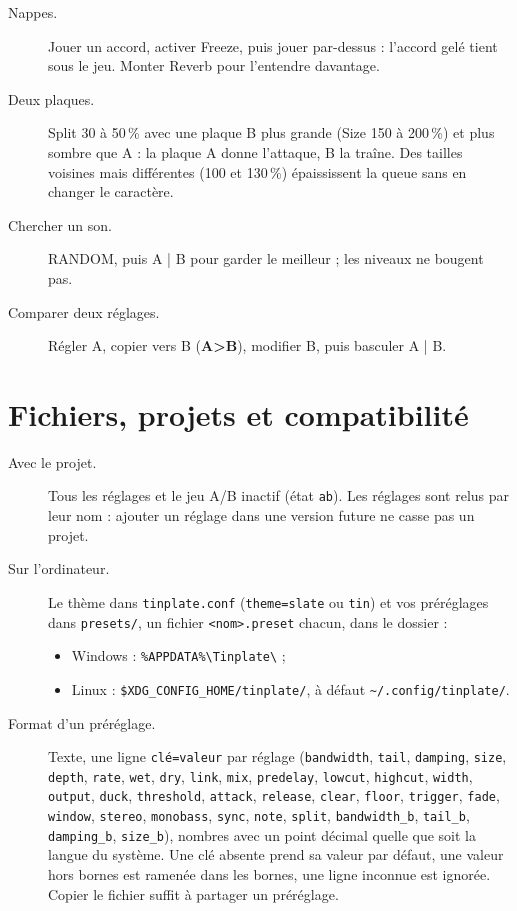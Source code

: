 \documentclass[a4paper,11pt]{article}
\newcommand{\ctl}[1]{\textsf{\textbf{#1}}}   %
\begin{document}
\begin{description}
\item[Nappes.] Jouer un accord, activer Freeze, puis jouer par-dessus : l'accord gelé tient sous
  le jeu. Monter Reverb pour l'entendre davantage.
\item[Deux plaques.] Split 30 à 50\,\% avec une plaque B plus grande (Size 150 à 200\,\%) et
  plus sombre que A : la plaque A donne l'attaque, B la traîne. Des tailles voisines mais
  différentes (100 et 130\,\%) épaississent la queue sans en changer le caractère.
\item[Chercher un son.] RANDOM, puis A | B pour garder le meilleur ; les niveaux ne bougent pas.
\item[Comparer deux réglages.] Régler A, copier vers B (\ctl{A>B}), modifier B, puis basculer A
  | B.
\end{description}

\section{Fichiers, projets et compatibilité}\label{sec:fichiers}

\begin{description}
\item[Avec le projet.] Tous les réglages et le jeu A/B inactif (état \texttt{ab}). Les réglages
  sont relus par leur nom : ajouter un réglage dans une version future ne casse pas un projet.
\item[Sur l'ordinateur.] Le thème dans \texttt{tinplate.conf} (\texttt{theme=slate} ou
  \texttt{tin}) et vos préréglages dans \texttt{presets/}, un fichier \texttt{<nom>.preset}
  chacun, dans le dossier :
  \begin{itemize}
  \item Windows : \verb|%APPDATA%\Tinplate\| ;
  \item Linux : \verb|$XDG_CONFIG_HOME/tinplate/|, à défaut \verb|~/.config/tinplate/|.
  \end{itemize}
\item[Format d'un préréglage.] Texte, une ligne \texttt{clé=valeur} par réglage
  (\texttt{bandwidth}, \texttt{tail}, \texttt{damping}, \texttt{size}, \texttt{depth}, \texttt{rate},
  \texttt{wet}, \texttt{dry}, \texttt{link}, \texttt{mix}, \texttt{predelay}, \texttt{lowcut},
  \texttt{highcut}, \texttt{width}, \texttt{output}, \texttt{duck}, \texttt{threshold},
  \texttt{attack}, \texttt{release}, \texttt{clear}, \texttt{floor}, \texttt{trigger},
  \texttt{fade}, \texttt{window}, \texttt{stereo}, \texttt{monobass}, \texttt{sync},
  \texttt{note}, \texttt{split}, \texttt{bandwidth\_b}, \texttt{tail\_b}, \texttt{damping\_b},
  \texttt{size\_b}), nombres avec un point décimal quelle que
  soit la langue du système. Une clé absente prend sa valeur par défaut, une valeur hors bornes
  est ramenée dans les bornes, une ligne inconnue est ignorée. Copier le fichier suffit à
  partager un préréglage.
\end{description}
\end{document}
